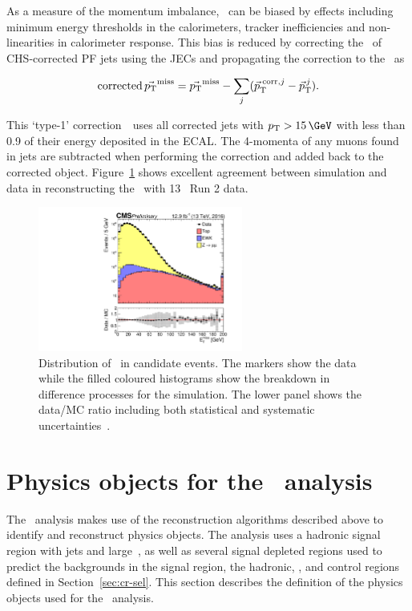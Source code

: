 As a measure of the momentum imbalance, \metvec~can be biased by effects including 
minimum energy thresholds in the calorimeters, tracker inefficiencies and non-linearities
in calorimeter response. This bias is reduced by correcting the \pt~of CHS-corrected PF jets 
using the JECs and propagating the correction to the \metvec~as

\begin{equation}
\text{corrected}\,\mbox{$\vec{{p_{\text T}}}^\text{miss}$} = \mbox{$\vec{{p_{\text T}}}^\text{miss}$} - \sum_{j}(\vec{p}^{\;\text{corr},j}_\text{T} -
\vec{p}_\text{T}^{\,j}).
\end{equation}

This `type-1' correction~\cite{met_fig}~uses all corrected jets with $\pt > 15\,\GeV$ with less than 0.9 of their energy deposited in the ECAL.
The 4-momenta of any muons found in jets are subtracted when performing the correction and added back to the corrected object.
Figure~\ref{fig:met_fig} shows excellent agreement between simulation and data
in reconstructing the \met~with 13 \TeV~Run 2 data.

\begin{figure}
\centering
    \includegraphics[width=0.6\textwidth]{./Figures/reconstruction/met_fig.pdf}
  \caption{Distribution of \met~in \zmumu candidate events. The markers show the data while the filled coloured histograms
  show the breakdown in difference processes for the simulation. The lower panel shows the data/MC ratio including
  both statistical and systematic uncertainties~\cite{met_fig}. \label{fig:met_fig} 
}
\end{figure}

\section{Physics objects for the \alphat~analysis}

The \alphat~analysis makes use of the reconstruction algorithms described above
to identify and reconstruct physics objects. The analysis uses a hadronic signal 
region with jets and large~\met, as well as several signal depleted regions used to predict the
backgrounds in the signal region, the hadronic, \gj, \mj and \mmj control regions defined in 
Section~\ref{sec:cr-sel}. This section describes the definition of the 
physics objects used for the \alphat~analysis.


